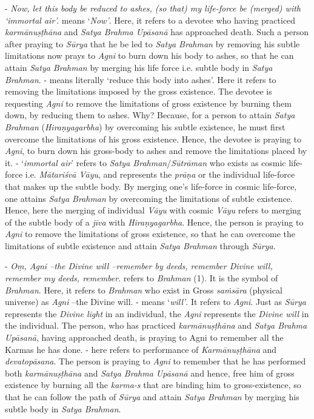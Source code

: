 - \emph{Now, let this body be reduced to ashes, (so that) my life-force be (merged) with `immortal air'.}  means `\emph{Now'}. Here, it refers to a devotee who having practiced \emph{karmānuṣṭhāna} and \emph{Satya Brahma Upāsanā} has approached death. Such a person after praying to \emph{Sūrya} that he be led to \emph{Satya Brahman} by removing his subtle limitations now prays to \emph{Agni} to burn down his body to ashes, so that he can attain \emph{Satya Brahman} by merging his life force i.e. subtle body in \emph{Satya Brahman}. - means literally `reduce this body into ashes'. Here it refers to removing the limitations imposed by the gross existence. The devotee is requesting \emph{Agni} to remove the limitations of gross existence by burning them down, by reducing them to ashes. Why? Because, for a person to attain \emph{Satya Brahman} (\emph{Hiraṇyagarbha}) by overcoming his subtle existence, he must first overcome the limitations of his gross existence. Hence, the devotee is praying to \emph{Agni}, to burn down his gross-body to ashes and remove the limitations placed by it. - `\emph{immortal air}' refers to \emph{Satya Brahman}/\emph{Sūtrāman} who exists as cosmic life-force i.e. \emph{Mātariśvā Vāyu}, and  represents the \emph{prāṇa} or the individual life-force that makes up the subtle body. By merging one's life-force in cosmic life-force, one attains \emph{Satya Brahman} by overcoming the limitations of subtle existence. Hence, here the merging of individual \emph{Vāyu} with cosmic \emph{Vāyu} refers to merging of the subtle body of a \emph{jīva} with \emph{Hiraṇyagarbha}. Hence, the person is praying to \emph{Agni} to remove the limitations of gross existence, so that he can overcome the limitations of subtle existence and attain \emph{Satya Brahman} through \emph{Sūrya}.

- \emph{Oṃ, Agni --the Divine will --remember by deeds, remember Divine will, remember my deeds, remember}.  refers to \emph{Brahman} (1). It is the symbol of \emph{Brahman}. Here, it refers to \emph{Brahman} who exist in Gross \emph{saṁsāra} (physical universe) as \emph{Agni} --the Divine will. - means `\emph{will'}. It refers to \emph{Agni}. Just as \emph{Sūrya} represents the \emph{Divine light} in an individual, the \emph{Agni} represents the \emph{Divine will} in the individual. The person, who has practiced \emph{karmānuṣṭhāna} and \emph{Satya Brahma Upāsanā}, having approached death, is praying to Agni to remember all the Karmas he has done. - here refers to performance of \emph{Karmānuṣṭhāna} and \emph{devatopāsana}. The person is praying to \emph{Agni} to remember that he has performed both \emph{karmānuṣṭhāna} and \emph{Satya Brahma Upāsanā} and hence, free him of gross existence by burning all the \emph{karma-s} that are binding him to gross-existence, so that he can follow the path of \emph{Sūrya} and attain \emph{Satya Brahman} by merging his subtle body in \emph{Satya Brahman}.

